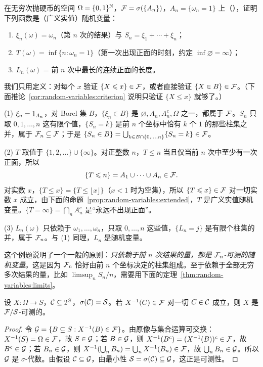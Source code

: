 \begin{workedexample}\label{we:random-variables:coin}
在无穷次抛硬币的空间 $\Omega=\{0,1\}^{\mathbb{N}}$，$\mathcal{F}=\sigma(\{A_n\})$，$A_n=\{\omega_n=1\}$ 上（），证明下列函数是（广义实值）随机变量：
\begin{enumerate}
\item $\xi_n(\omega)=\omega_n$（第 $n$ 次的结果）与 $S_n=\xi_1+\cdots+\xi_n$；
\item $T(\omega)=\inf\{n:\omega_n=1\}$（第一次出现正面的时刻，约定 $\inf\varnothing=\infty$）；
\item $L_n(\omega)$ = 前 $n$ 次中最长的连续正面的长度。
\end{enumerate}
\end{workedexample}
\begin{solution}
我们只用定义：对每个 $x$ 验证 $\{X\leqslant x\}\in\mathcal{F}$，或者直接验证 $\{X\in B\}\in\mathcal{F}$。（下面推论~\ref{cor:random-variables:criterion} 说明只验证 $\{X\leqslant x\}$ 就够了。）

(1) $\xi_n=1_{A_n}$，对 Borel 集 $B$，$\{\xi_n\in B\}$ 是 $\varnothing,A_n,A_n^c,\Omega$ 之一，都属于 $\mathcal{F}$。$S_n$ 只取 $0,1,\dots,n$ 这有限个值，$\{S_n=k\}$ 是前 $n$ 个坐标中恰有 $k$ 个 $1$ 的那些柱集之并，属于 $\mathcal{F}_n\subseteq\mathcal{F}$；于是 $\{S_n\in B\}=\bigcup_{k\in B\cap\{0,\dots,n\}}\{S_n=k\}\in\mathcal{F}$。

(2) $T$ 取值于 $\{1,2,\dots\}\cup\{\infty\}$。对正整数 $n$，$T\leqslant n$ 当且仅当前 $n$ 次中至少有一次正面，所以
\[
\{T\leqslant n\}=A_1\cup\cdots\cup A_n\in\mathcal{F} .
\]
对实数 $x$，$\{T\leqslant x\}=\{T\leqslant\lfloor x\rfloor\}$（$x<1$ 时为空集），所以 $\{T\leqslant x\}\in\mathcal{F}$ 对一切实数 $x$ 成立，由下面的命题~\ref{prop:random-variables:extended}，$T$ 是广义实值随机变量。$\{T=\infty\}=\bigcap_nA_n^c$ 是“永远不出现正面”。

(3) $L_n(\omega)$ 只依赖于 $\omega_1,\dots,\omega_n$，只取 $0,\dots,n$ 这些值，$\{L_n=j\}$ 是有限个柱集的并，属于 $\mathcal{F}_n$。与 (1) 同理，$L_n$ 是随机变量。

这个例题说明了一个一般的原则：\emph{只依赖于前 $n$ 次结果的量，都是 $\mathcal{F}_n$-可测的随机变量}。这是因为 $\mathcal{F}_n$ 恰好由前 $n$ 个坐标决定的柱集组成。至于依赖于全部无穷多次结果的量，比如 $\limsup_nS_n/n$，需要用下面的定理~\ref{thm:random-variables:limits}。
\end{solution}

\begin{theorem}[在生成元上验证可测性]\label{thm:random-variables:generators}
设 $X:\Omega\to S$，$\mathcal{C}\subseteq2^S$，$\sigma(\mathcal{C})=\mathcal{S}$。若 $X^{-1}(C)\in\mathcal{F}$ 对一切 $C\in\mathcal{C}$ 成立，则 $X$ 是 $\mathcal{F}/\mathcal{S}$-可测的。
\end{theorem}
\begin{proof}
令 $\mathcal{G}=\{B\subseteq S: X^{-1}(B)\in\mathcal{F}\}$。由原像与集合运算可交换：$X^{-1}(S)=\Omega\in\mathcal{F}$，故 $S\in\mathcal{G}$；若 $B\in\mathcal{G}$，则 $X^{-1}(B^c)=(X^{-1}(B))^c\in\mathcal{F}$，故 $B^c\in\mathcal{G}$；若 $B_n\in\mathcal{G}$，则 $X^{-1}(\bigcup_nB_n)=\bigcup_nX^{-1}(B_n)\in\mathcal{F}$，故 $\bigcup_nB_n\in\mathcal{G}$。所以 $\mathcal{G}$ 是 $\sigma$-代数。由假设 $\mathcal{C}\subseteq\mathcal{G}$，由最小性 $\mathcal{S}=\sigma(\mathcal{C})\subseteq\mathcal{G}$，这正是可测性。
\end{proof}


